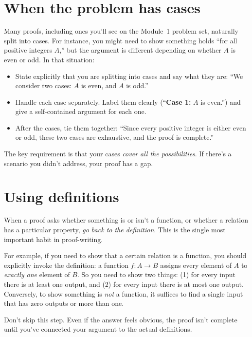 \documentclass[11pt]{article}
\begin{document}
\section{When the problem has cases}

Many proofs, including ones you'll see on the Module~1 problem set, naturally split into cases. For instance, you might need to show something holds ``for all positive integers $A$,'' but the argument is different depending on whether $A$ is even or odd. In that situation:

\begin{itemize}
  \item State explicitly that you are splitting into cases and say what they are: ``We consider two cases: $A$ is even, and $A$ is odd.''
  \item Handle each case separately. Label them clearly (``\textbf{Case 1:} $A$ is even.'') and give a self-contained argument for each one.
  \item After the cases, tie them together: ``Since every positive integer is either even or odd, these two cases are exhaustive, and the proof is complete.''
\end{itemize}

The key requirement is that your cases \emph{cover all the possibilities}. If there's a scenario you didn't address, your proof has a gap.

\section{Using definitions}

When a proof asks whether something is or isn't a function, or whether a relation has a particular property, \emph{go back to the definition}. This is the single most important habit in proof-writing.

For example, if you need to show that a certain relation is a function, you should explicitly invoke the definition: a function $f : A \to B$ assigns every element of $A$ to \emph{exactly one} element of $B$. So you need to show two things: (1) for every input there is at least one output, and (2) for every input there is at most one output. Conversely, to show something is \emph{not} a function, it suffices to find a single input that has zero outputs or more than one.

Don't skip this step. Even if the answer feels obvious, the proof isn't complete until you've connected your argument to the actual definitions.
\end{document}
